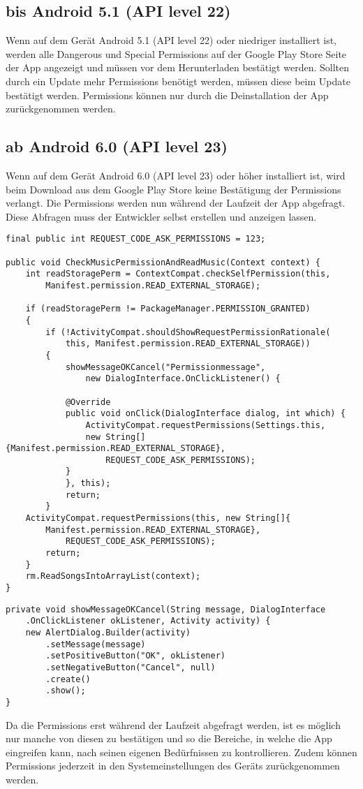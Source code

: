 \documentclass[FIPLY_base.tex]{subfiles}
\begin{document}
\newpage
\subsection{bis Android 5.1 (API level 22)}
Wenn auf dem Gerät Android 5.1 (API level 22) oder niedriger installiert ist, werden alle Dangerous und Special Permissions auf der Google Play Store Seite der App angezeigt 
und müssen vor dem Herunterladen bestätigt werden. 
Sollten durch ein Update mehr Permissions benötigt werden, müssen diese beim Update bestätigt werden. 
Permissions können nur durch die Deinstallation der App zurückgenommen werden.

\subsection{ab Android 6.0 (API level 23)}
Wenn auf dem Gerät Android 6.0 (API level 23) oder höher installiert ist, wird beim Download aus dem Google Play Store keine Bestätigung der Permissions verlangt.
Die Permissions werden nun während der Laufzeit der App abgefragt. Diese Abfragen muss der Entwickler selbst erstellen und anzeigen lassen.

\begin{lstlisting}
final public int REQUEST_CODE_ASK_PERMISSIONS = 123;

public void CheckMusicPermissionAndReadMusic(Context context) {
	int readStoragePerm = ContextCompat.checkSelfPermission(this, 
		Manifest.permission.READ_EXTERNAL_STORAGE);

	if (readStoragePerm != PackageManager.PERMISSION_GRANTED) 
	{
		if (!ActivityCompat.shouldShowRequestPermissionRationale(
			this, Manifest.permission.READ_EXTERNAL_STORAGE)) 
		{
			showMessageOKCancel("Permissionmessage", 
				new DialogInterface.OnClickListener() {
				
			@Override
			public void onClick(DialogInterface dialog, int which) {
				ActivityCompat.requestPermissions(Settings.this,
				new String[]{Manifest.permission.READ_EXTERNAL_STORAGE},
					REQUEST_CODE_ASK_PERMISSIONS);
			}
			}, this);
			return;
		}
	ActivityCompat.requestPermissions(this, new String[]{
		Manifest.permission.READ_EXTERNAL_STORAGE}, 
			REQUEST_CODE_ASK_PERMISSIONS);
		return;
	}
	rm.ReadSongsIntoArrayList(context);
}
\end{lstlisting}

\begin{lstlisting}
private void showMessageOKCancel(String message, DialogInterface
	.OnClickListener okListener, Activity activity) {
	new AlertDialog.Builder(activity)
		.setMessage(message)
		.setPositiveButton("OK", okListener)
		.setNegativeButton("Cancel", null)
		.create()
		.show();
}
\end{lstlisting}
Da die Permissions erst während der Laufzeit abgefragt werden, ist es möglich nur manche von diesen zu bestätigen und so die Bereiche, in welche die App eingreifen kann, nach seinen eigenen Bedürfnissen zu kontrollieren.
Zudem können Permissions jederzeit in den Systemeinstellungen des Geräts zurückgenommen werden.
\end{document}
